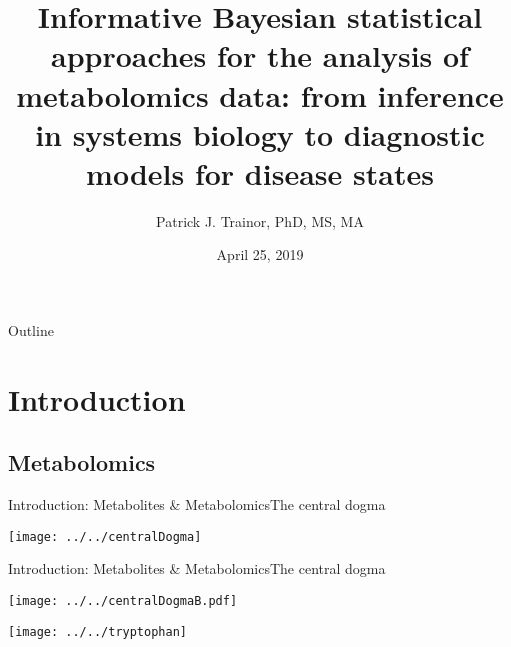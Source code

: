 \documentclass[xcolor=dvipsnames]{beamer}
\begin{document}
	
\title[Bayesian Approaches in Metabolomics]{{\bf Informative Bayesian statistical approaches for the analysis of metabolomics data: from inference in systems biology to diagnostic models for disease states}}
\author[P.J. Trainor]{Patrick J. Trainor, PhD, MS, MA}
\date[April 2019]{April 25, 2019}

\begin{frame}
	\titlepage
\end{frame}

\begin{frame}{Outline}
\vspace{-10.5pt}
\tableofcontents[hideallsubsections]
\end{frame}

\section{Introduction}
\subsection{Metabolomics}

\begin{frame}{Introduction: Metabolites \& Metabolomics}{The central dogma}
\vspace{-7 pt}
\begin{center}
		\texttt{[image: ../../centralDogma]}
	\end{center}
\end{frame}

\begin{frame}{Introduction: Metabolites \& Metabolomics}{The central dogma}
\vspace{-7 pt}
\begin{center}
	\texttt{[image: ../../centralDogmaB.pdf]}
\end{center}
\addtocounter{framenumber}{-1}
\end{frame}

\begin{frame}
	\vspace{-10.5pt}
	\begin{center}
		\texttt{[image: ../../tryptophan]}
		
	\end{center}
\end{frame}
\end{document}
